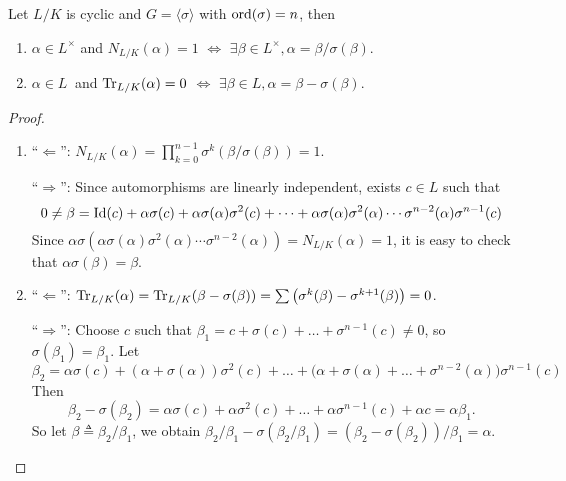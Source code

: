 \begin{theorem} \label{thm:Hilbert-theorem-90}
  Let $L/K$ is cyclic and $G = \langle \sigma \rangle$ with $\operatorname{ord}(\sigma) = n$, then
  \begin{enumerate}
    \item $\alpha \in L^\times$ and $N_{L/K}(\alpha) = 1$ $\iff$ $\exists \beta \in L^\times, \alpha = \beta / \sigma(\beta)$.
    \item $\alpha \in L^{\ }$ and $\operatorname{Tr}_{L/K}(\alpha) = 0$ $\iff$ $\exists \beta \in L, \alpha = \beta - \sigma(\beta)$.
  \end{enumerate}

  \begin{proof} \hfill
    \begin{enumerate}
      \item ``$\Leftarrow$'': $N_{L/K}(\alpha) = \prod_{k=0}^{n-1} \sigma^k(\beta / \sigma(\beta)) = 1$.

        ``$\Rightarrow$'':  Since automorphisms are linearly independent, exists $c \in L$
        such that
        \[ 0 \neq \beta = {\rm Id}(c) + \alpha \sigma(c) + \alpha \sigma(\alpha) \sigma^2(c)
          + \dots + \alpha \sigma(\alpha) \sigma^2(\alpha) \dotsm \sigma^{n-2}(\alpha) \sigma^{n-1}(c) \]
        Since $\alpha\sigma(\alpha \sigma(\alpha) \sigma^2(\alpha) \dotsm \sigma^{n-2}(\alpha)) = N_{L/K}(\alpha) = 1$,
        it is easy to check that $\alpha \sigma(\beta) = \beta$.

      \item ``$\Leftarrow$'': $\operatorname{Tr}_{L/K}(\alpha) = \operatorname{Tr}_{L/K}(\beta - \sigma(\beta))
        = \sum \left(\sigma^k(\beta) -\sigma^{k+1}(\beta)\right) = 0$.

        ``$\Rightarrow$'':
        Choose $c$ such that $\beta_1 = c + \sigma(c) + \dots + \sigma^{n-1}(c) \neq 0$,
        so $\sigma(\beta_1) = \beta_1$.  Let
        \[ \beta_2 = \alpha \sigma(c) + (\alpha + \sigma(\alpha)) \sigma^2(c) + \dots +
          \big( \alpha + \sigma(\alpha) + \dots + \sigma^{n-2}(\alpha) \big) \sigma^{n-1}(c) \]
        Then
        \[ \beta_2 - \sigma(\beta_2) = \alpha \sigma(c) + \alpha \sigma^2(c) + \dots + \alpha \sigma^{n-1}(c)
          + \alpha c = \alpha \beta_1. \]
        So let $\beta \triangleq \beta_2 / \beta_1$, we obtain $\beta_2/\beta_1 - \sigma(\beta_2/\beta_1) =
        (\beta_2 - \sigma(\beta_2)) / \beta_1 = \alpha$.
        \qedhere
    \end{enumerate}
  \end{proof}
\end{theorem}

